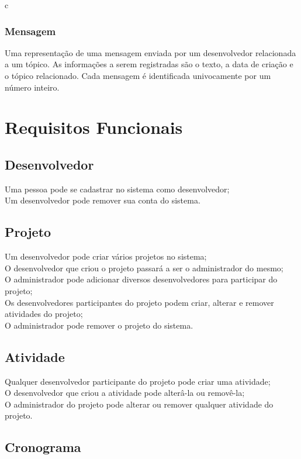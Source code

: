 c\documentclass{article}
\begin{document}
		\subsubsection{Mensagem}
		Uma representação de uma mensagem enviada por um desenvolvedor relacionada a um tópico. As informações a serem registradas são o texto, a data de criação e o tópico relacionado. Cada mensagem é identificada univocamente por um número inteiro.



\section{Requisitos Funcionais}

	\subsection{Desenvolvedor}
	Uma pessoa pode se cadastrar no sistema como desenvolvedor;\\
	Um desenvolvedor pode remover sua conta do sistema.

	\subsection{Projeto}
	Um desenvolvedor pode criar vários projetos no sistema;\\
	O desenvolvedor que criou o projeto passará a ser o administrador do mesmo;\\
	O administrador pode adicionar diversos desenvolvedores para participar do projeto;\\
	Os desenvolvedores participantes do projeto podem criar, alterar e remover atividades do projeto;\\
	O administrador pode remover o projeto do sistema.

	\subsection{Atividade}
	Qualquer desenvolvedor participante do projeto pode criar uma atividade;\\
	O desenvolvedor que criou a atividade pode alterâ-la ou removê-la;\\
	O administrador do projeto pode alterar ou remover qualquer atividade do projeto.

	\subsection{Cronograma}
\end{document}
